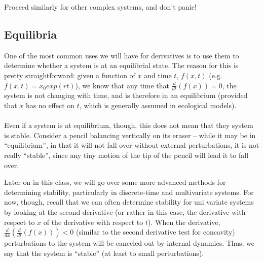 \documentclass[12pt]{article}
\begin{document}
Proceed similarly for other complex systems, and don't panic!

\subsection{Equilibria}
One of the most common uses we will have for derivatives is to use them to determine whether a system is at an equilibrial state. The reason for this is pretty straightforward: given a function of $x$ and time $t$, $f(x, t)$ (e.g. $f(x,t) = x_{0} exp(rt)$), we know that any time that $\frac{d}{dt}(f(x)) = 0$, the system is not changing with time, and is therefore in an equilibrium (provided that $x$ has no effect on $t$, which is generally assumed in ecological models).

\paragraph{} Even if a system is at equilibrium, though, this does not mean that they system is stable. Consider a pencil balancing vertically on its eraser -- while it may be in ``equilibrium'', in that it will not fall over without external perturbations, it is not really ``stable'', since any tiny motion of the tip of the pencil will lead it to fall over.

Later on in this class, we will go over some more advanced methods for determining stability, particularly in discrete-time and multivariate systems. For now, though, recall that we can often determine stability for uni variate systems by looking at the second derivative (or rather in this case, the derivative with respect to $x$ of the derivative with respect to $t$). When the derivative, $\frac{d}{dx}(\frac{d}{dt}(f(x))) < 0$ (similar to the second derivative test for concavity) perturbations to the system will be canceled out by internal dynamics. Thus, we say that the system is ``stable'' (at least to small perturbations).
\end{document}
